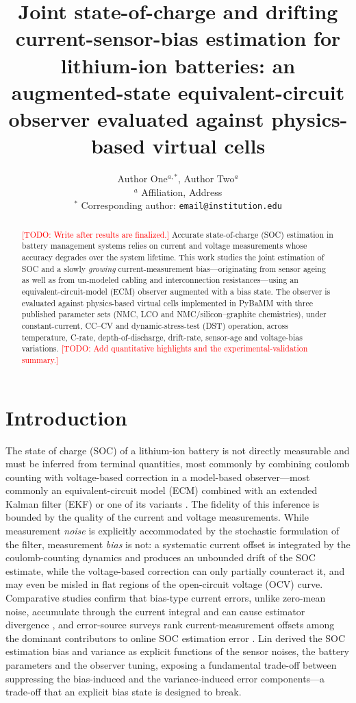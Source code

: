 \documentclass[11pt,a4paper]{article}
\title{Joint state-of-charge and drifting current-sensor-bias estimation for
lithium-ion batteries: an augmented-state equivalent-circuit observer
evaluated against physics-based virtual cells}
\author{%
  Author One$^{a,\ast}$, Author Two$^{a}$\\[2pt]
  \small $^{a}$ Affiliation, Address\\
  \small $^{\ast}$ Corresponding author: \texttt{email@institution.edu}}
\date{}
\newcommand{\todo}[1]{\textcolor{red}{[TODO: #1]}}
\begin{document}
\maketitle

\begin{abstract}
\todo{Write after results are finalized.}
Accurate state-of-charge (SOC) estimation in battery management systems
relies on current and voltage measurements whose accuracy degrades over the
system lifetime. This work studies the joint estimation of SOC and a slowly
\emph{growing} current-measurement bias---originating from sensor ageing as
well as from un-modeled cabling and interconnection resistances---using an
equivalent-circuit-model (ECM) observer augmented with a bias state. The
observer is evaluated against physics-based virtual cells implemented in
PyBaMM with three published parameter sets (NMC, LCO and NMC/silicon--graphite
chemistries), under constant-current, CC--CV and dynamic-stress-test (DST)
operation, across temperature, C-rate, depth-of-discharge, drift-rate,
sensor-age and voltage-bias variations.
\todo{Add quantitative highlights and the experimental-validation summary.}
\end{abstract}

\section{Introduction}
\label{sec:intro}

The state of charge (SOC) of a lithium-ion battery is not directly
measurable and must be inferred from terminal quantities, most commonly by
combining coulomb counting with voltage-based correction in a model-based
observer---most commonly an equivalent-circuit model (ECM)
\citep{hu2012comparative} combined with an extended Kalman filter (EKF)
or one of its variants \citep{plett2004extended,plett2004extended2,%
plett2004extended3}. The fidelity of this inference is bounded by the
quality of the current and voltage measurements. While measurement
\emph{noise} is explicitly accommodated by the stochastic formulation of the
filter, measurement \emph{bias} is not: a systematic current offset is
integrated by the coulomb-counting dynamics and produces an unbounded drift
of the SOC estimate, while the voltage-based correction can only partially
counteract it, and may even be misled in flat regions of the open-circuit
voltage (OCV) curve. Comparative studies confirm that bias-type current
errors, unlike zero-mean noise, accumulate through the current integral and
can cause estimator divergence \citep{he2022comparative}, and error-source
surveys rank current-measurement offsets among the dominant contributors to
online SOC estimation error \citep{zheng2018investigating,truchot2014state}.
Lin \citep{lin2018theoretical} derived the SOC estimation bias and variance
as explicit functions of the sensor noises, the battery parameters and the
observer tuning, exposing a fundamental trade-off between suppressing the
bias-induced and the variance-induced error components---a trade-off that
an explicit bias state is designed to break.
\end{document}
